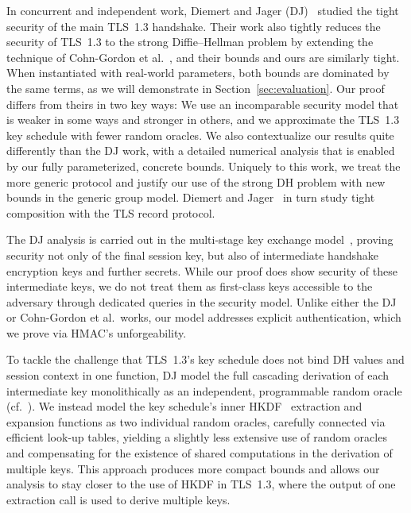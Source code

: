 In concurrent and independent work, Diemert and Jager (DJ)~\cite{JC:DieJag20} studied the tight security of the main TLS~1.3 handshake.
Their work also tightly reduces the security of TLS~1.3 to the strong Diffie--Hellman problem by extending the technique of Cohn-Gordon et al.~\cite{C:CCGJJ19}, and their bounds and ours are similarly tight.
When instantiated with real-world parameters, both bounds are dominated by the same terms, as we will demonstrate in Section~\ref{sec:evaluation}.
Our proof differs from theirs in two key ways:
We use an incomparable security model that is weaker in some ways and stronger in others, and we approximate the TLS~1.3 key schedule with fewer random oracles.
We also contextualize our results quite differently than the DJ work, with a detailed numerical analysis that is enabled by our fully parameterized, concrete bounds.
Uniquely to this work, we treat the more generic \SIGMAI protocol and justify our use of the strong DH problem with new bounds in the generic group model.
Diemert and Jager~\cite{JC:DieJag20} in turn study tight composition with the TLS record protocol. 

The DJ analysis is carried out in the multi-stage key exchange model~\cite{CCS:FisGue14}, proving security not only of the final session key, but also of intermediate handshake encryption keys and further secrets.
While our proof does show security of these intermediate keys, we do not treat them as first-class keys accessible to the adversary through dedicated queries in the security model.
Unlike either the DJ or Cohn-Gordon et al.\ works, our model addresses explicit authentication, which we prove via HMAC's unforgeability.

To tackle the challenge that TLS~1.3's key schedule does not bind DH values and session context in one function, DJ model the full cascading derivation of each intermediate key monolithically as an independent, programmable random oracle (cf.~\cite[Theorem~6]{JC:DieJag20}). 
We instead model the key schedule's inner HKDF~\cite{C:Krawczyk10} extraction and expansion functions as two individual random oracles, carefully connected via efficient look-up tables, yielding a slightly less extensive use of random oracles and compensating for the existence of shared computations in the derivation of multiple keys.
This approach produces more compact bounds and allows our analysis to stay closer to the use of HKDF in TLS~1.3, where the output of one extraction call is used to derive multiple keys.


